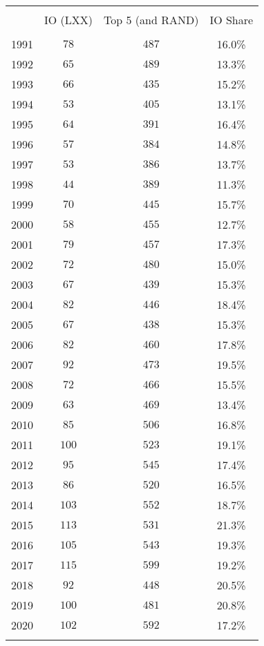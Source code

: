 
\begin{table}[!htbp] \centering 
  \caption{} 
  \label{} 
\footnotesize 
\begin{tabular}{@{\extracolsep{5pt}} cccc} 
\\[-1.8ex]\hline 
\hline \\[-1.8ex] 
 & IO (LXX) & Top 5 (and RAND) & IO Share \\ 
\hline \\[-1.8ex] 
1991 & $78$ & $487$ & 16.0\% \\ 
1992 & $65$ & $489$ & 13.3\% \\ 
1993 & $66$ & $435$ & 15.2\% \\ 
1994 & $53$ & $405$ & 13.1\% \\ 
1995 & $64$ & $391$ & 16.4\% \\ 
1996 & $57$ & $384$ & 14.8\% \\ 
1997 & $53$ & $386$ & 13.7\% \\ 
1998 & $44$ & $389$ & 11.3\% \\ 
1999 & $70$ & $445$ & 15.7\% \\ 
2000 & $58$ & $455$ & 12.7\% \\ 
2001 & $79$ & $457$ & 17.3\% \\ 
2002 & $72$ & $480$ & 15.0\% \\ 
2003 & $67$ & $439$ & 15.3\% \\ 
2004 & $82$ & $446$ & 18.4\% \\ 
2005 & $67$ & $438$ & 15.3\% \\ 
2006 & $82$ & $460$ & 17.8\% \\ 
2007 & $92$ & $473$ & 19.5\% \\ 
2008 & $72$ & $466$ & 15.5\% \\ 
2009 & $63$ & $469$ & 13.4\% \\ 
2010 & $85$ & $506$ & 16.8\% \\ 
2011 & $100$ & $523$ & 19.1\% \\ 
2012 & $95$ & $545$ & 17.4\% \\ 
2013 & $86$ & $520$ & 16.5\% \\ 
2014 & $103$ & $552$ & 18.7\% \\ 
2015 & $113$ & $531$ & 21.3\% \\ 
2016 & $105$ & $543$ & 19.3\% \\ 
2017 & $115$ & $599$ & 19.2\% \\ 
2018 & $92$ & $448$ & 20.5\% \\ 
2019 & $100$ & $481$ & 20.8\% \\ 
2020 & $102$ & $592$ & 17.2\% \\ 
\hline \\[-1.8ex] 
\end{tabular} 
\end{table} 
